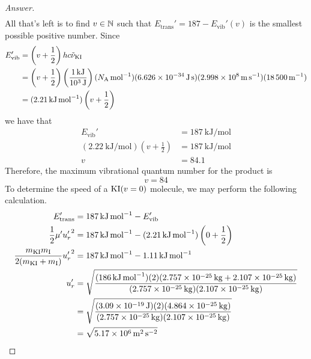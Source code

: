 \documentclass[../psets.tex]{subfiles}
\begin{document}
\begin{enumerate}[label={\textbf{30-\arabic*.}},leftmargin=3.5em]
\begin{proof}[Answer]
\begin{align*}
        \end{align*}
        All that's left is to find $v\in\mathbb{N}$ such that $E_\text{trans}'=187-E_\text{vib}'(v)$ is the smallest possible positive number. Since
        \begin{align*}
            E_\text{vib}' &= \left( v+\frac{1}{2} \right)hc\tilde{\nu}_{\ce{KI}}\\
            &= \left( v+\frac{1}{2} \right)\left( \frac{\SI{1}{\kilo\joule}}{\SI{e3}{\joule}} \right)(\NA\,\si{\per\mole})(\SI{6.626e-34}{\joule\second})(\SI{2.998e8}{\meter\per\second})(\SI{18500}{\per\meter})\\
            &= (\SI{2.21}{\kilo\joule\per\mole})\left( v+\frac{1}{2} \right)
        \end{align*}
        we have that
        \begin{align*}
            E_\text{vib}' &= \SI{187}{\kilo\joule\per\mole}\\
            (\SI{2.22}{\kilo\joule\per\mole})\left( v+\frac{1}{2} \right) &= \SI{187}{\kilo\joule\per\mole}\\
            v &= 84.1
        \end{align*}
        Therefore, the maximum vibrational quantum number for the product  is
        \begin{equation*}
            \boxed{v = 84}
        \end{equation*}
        To determine the speed of a $\ce{KI}(v=0)$ molecule, we may perform the following calculation.
        \begin{align*}
            E_\text{trans}' &= \SI{187}{\kilo\joule\per\mole}-E_\text{vib}'\\
            \frac{1}{2}\mu'{u_r'}^2 &= \SI{187}{\kilo\joule\per\mole}-(\SI{2.21}{\kilo\joule\per\mole})\left( 0+\frac{1}{2} \right)\\
            \frac{m_{\ce{KI}}m_{\ce{I}}}{2(m_{\ce{KI}}+m_{\ce{I}})}{u_r'}^2 &= \SI{187}{\kilo\joule\per\mole}-\SI{1.11}{\kilo\joule\per\mole}\\
            u_r' &= \sqrt{\frac{(\SI{186}{\kilo\joule\per\mole})(2)(\SI{2.757e-25}{\kilo\gram}+\SI{2.107e-25}{\kilo\gram})}{(\SI{2.757e-25}{\kilo\gram})(\SI{2.107e-25}{\kilo\gram})}}\\
            &= \sqrt{\frac{(\SI{3.09e-19}{\joule})(2)(\SI{4.864e-25}{\kilo\gram})}{(\SI{2.757e-25}{\kilo\gram})(\SI{2.107e-25}{\kilo\gram})}}\\
            &= \sqrt{\SI{5.17e6}{\meter\squared\per\second\squared}}\\

\end{align*}
\end{proof}
\end{enumerate}
\end{document}

